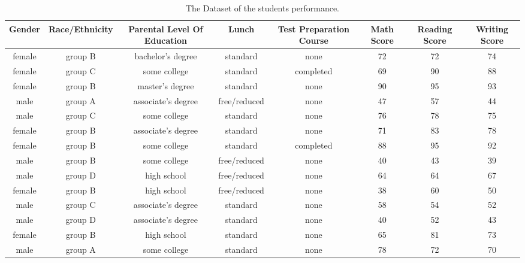 \documentclass{article}
\begin{document}
	
	
	\begin{sidewaystable}[h!]
		\begin{center}
			\caption{The Dataset of the students performance.}
			\label{tab:Table}
			\begin{small}
			\begin{tabular}{|S|S|S|S|S|S|S|S|}
				\hline 
				\textbf{}\textcolor{white!25}{Gender} & \textbf{Race/Ethnicity} & \textbf{Parental Level Of Education} & \textbf{Lunch} & \textbf{}\textcolor{white!25}{Test Preparation Course}& \textbf{}\textcolor{white!25}{Math Score}&\textbf{}\textcolor{white!25}{Reading Score} &\textbf{}\textcolor{white!25}{Writing Score}\\
				\hline
				female & group B & bachelor's degree & standard & none & 72 & 72 & 74\\
				\hline
				female & group C & some college & standard & completed & 69 & 90 & 88\\
				\hline
				female & group B & master's degree & standard & none & 90 & 95 & 93\\
				\hline
				male & group A & associate's degree & free/reduced & none & 47 & 57 & 44\\
				\hline
				male & group C & some college & standard & none & 76 & 78 & 75\\
				\hline
				female & group B & associate's degree & standard & none & 71 & 83 & 78\\
				\hline
				female & group B & some college & standard & completed & 88 & 95 & 92\\
				\hline
				male & group B & some college & free/reduced & none & 40 & 43 & 39\\
				\hline
				male & group D & high school & free/reduced & none & 64 & 64 & 67\\
				\hline
				female & group B & high school & free/reduced & none & 38 & 60 & 50\\
				\hline
				male & group C & associate's degree & standard & none & 58 & 54 & 52\\
				\hline
				male & group D & associate's degree & standard & none & 40 & 52 & 43\\
				\hline
				female & group B & high school & standard & none & 65 & 81 & 73\\
				\hline
				male & group A & some college & standard & none & 78 & 72 & 70\\
				\hline
			\end{tabular}
		 \end{small}
		\end{center}
	\end{sidewaystable}
	
\end{document}
